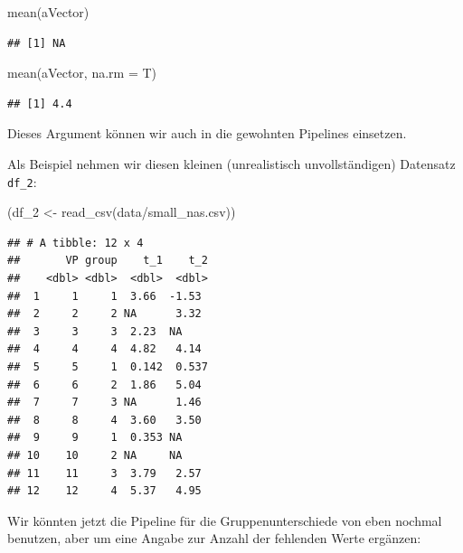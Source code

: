 \documentclass[
]{book}
\newenvironment{Shaded}{\begin{snugshade}}{\end{snugshade}}
\newcommand{\AttributeTok}[1]{\textcolor[rgb]{0.77,0.63,0.00}{#1}}
\newcommand{\FunctionTok}[1]{\textcolor[rgb]{0.00,0.00,0.00}{#1}}
\newcommand{\NormalTok}[1]{#1}
\newcommand{\OtherTok}[1]{\textcolor[rgb]{0.56,0.35,0.01}{#1}}
\newcommand{\StringTok}[1]{\textcolor[rgb]{0.31,0.60,0.02}{#1}}
\begin{document}
\begin{Shaded}
\begin{Highlighting}[]
\FunctionTok{mean}\NormalTok{(aVector)}
\end{Highlighting}
\end{Shaded}

\begin{verbatim}
## [1] NA
\end{verbatim}

\begin{Shaded}
\begin{Highlighting}[]
\FunctionTok{mean}\NormalTok{(aVector, }\AttributeTok{na.rm =}\NormalTok{ T)}
\end{Highlighting}
\end{Shaded}

\begin{verbatim}
## [1] 4.4
\end{verbatim}

Dieses Argument können wir auch in die gewohnten Pipelines einsetzen.

Als Beispiel nehmen wir diesen kleinen (unrealistisch unvollständigen) Datensatz \texttt{df\_2}:

\begin{Shaded}
\begin{Highlighting}[]
\NormalTok{(df\_2 }\OtherTok{\textless{}{-}} \FunctionTok{read\_csv}\NormalTok{(}\StringTok{\textquotesingle{}data/small\_nas.csv\textquotesingle{}}\NormalTok{))}
\end{Highlighting}
\end{Shaded}

\begin{verbatim}
## # A tibble: 12 x 4
##       VP group    t_1    t_2
##    <dbl> <dbl>  <dbl>  <dbl>
##  1     1     1  3.66  -1.53 
##  2     2     2 NA      3.32 
##  3     3     3  2.23  NA    
##  4     4     4  4.82   4.14 
##  5     5     1  0.142  0.537
##  6     6     2  1.86   5.04 
##  7     7     3 NA      1.46 
##  8     8     4  3.60   3.50 
##  9     9     1  0.353 NA    
## 10    10     2 NA     NA    
## 11    11     3  3.79   2.57 
## 12    12     4  5.37   4.95
\end{verbatim}

Wir könnten jetzt die Pipeline für die Gruppenunterschiede von eben nochmal benutzen, aber um eine Angabe zur Anzahl der fehlenden Werte ergänzen:
\end{document}
